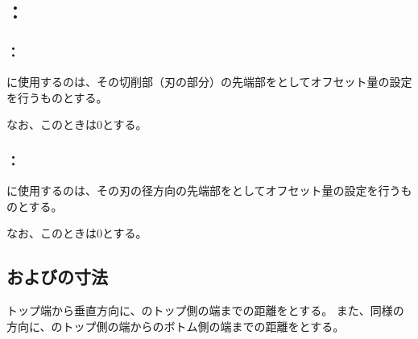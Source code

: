 \subsection{\indexTCKeywayMilling\nameToolCorrection：\nameKeywayMilling}


\subsubsection{\indexTLCKeywayMilling\nameTLCorrection：\nameKeywayMilling}
\KeywayMilling に使用する\indexTLSideCutter\nameSideCutter の\nameToolLength は、その切削部（刃の部分）の先端部を\ToolLength としてオフセット量の設定を行うものとする。

なお、このとき\TLCWearValue は0とする。


\subsubsection{\indexTDCKeywayMilling\nameTDCorrection：\nameKeywayMilling}
\KeywayMilling に使用する\indexTDSideCutter\nameSideCutter の\nameToolDiameter は、その刃の径方向の先端部を\ToolDiameter としてオフセット量の設定を行うものとする。

なお、このとき\TDCWearValue は0とする。


\subsection{\indexKeywayPosDimension\indexKeywayWidthDimension\KeywayPos および\KeywayWidth の寸法}
トップ端から垂直方向に、\Keyway のトップ側の端までの距離を\KeywayPos とする。
また、同様の方向に、\Keyway のトップ側の端から\Keyway のボトム側の端までの距離を\KeywayWidth とする。


